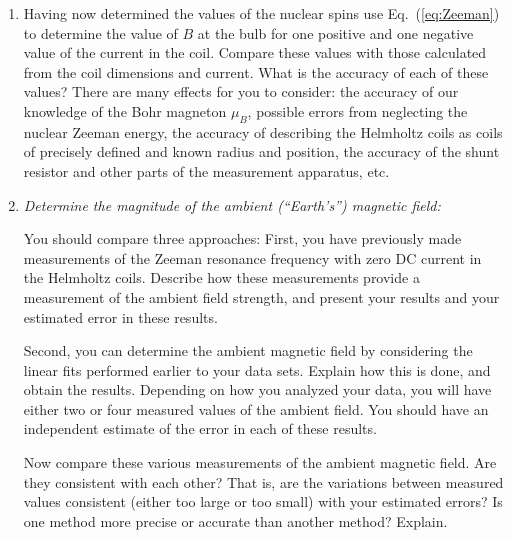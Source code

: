\documentclass{../lab}
\begin{document}
\begin{enumerate}
    \item Having now determined the values of the nuclear spins use Eq.\ (\ref{eq:Zeeman}) to determine the value of $B$ at the bulb for one positive and one negative value of the current in the coil. Compare these values with those calculated from the coil dimensions and current.   What is the accuracy of each of these values? There are many effects for you to consider: the accuracy of our knowledge of the Bohr magneton $\mu_B$, possible errors from neglecting the nuclear Zeeman energy, the accuracy of describing the Helmholtz coils as coils of precisely defined and known radius and position, the accuracy of the shunt resistor and other parts of the measurement apparatus, etc.
    


    \item \emph{Determine the magnitude of the ambient (``Earth's'') magnetic field:} 
    
    You should compare three approaches:  First, you have previously made measurements of the Zeeman resonance frequency with zero DC current in the Helmholtz coils.  Describe how these measurements provide a measurement of the ambient field strength, and present your results and your estimated error in these results.
    
    Second, you can determine the ambient magnetic field by considering the linear fits performed earlier to your data sets.  Explain how this is done, and obtain the results.  Depending on how you analyzed your data, you will have either two or four measured values of the ambient field.  You should have an independent estimate of the error in each of these results.

    
    Now compare these various measurements of the ambient magnetic field.  Are they consistent with each other?  That is, are the variations between measured values consistent (either too large or too small) with your estimated errors?  Is one method more precise or accurate than another method?   Explain.


\end{enumerate}
\end{document}
